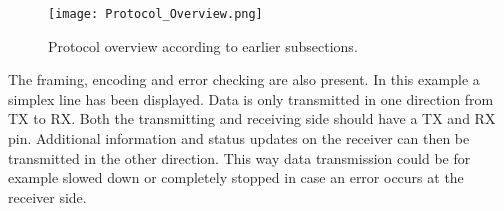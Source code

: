 \begin{figure}[H]
	\centering
	\texttt{[image: Protocol\_Overview.png]}	
	\caption{Protocol overview according to earlier subsections.}
	\label{fig:protocol_overview}
\end{figure} 

The framing, encoding and error checking are also present. In this example a simplex line has been displayed. Data is only transmitted in one direction from TX to RX. Both the transmitting and receiving side should have a TX and RX pin. Additional information and status updates on the receiver can then be transmitted in the other direction. This way data transmission could be for example slowed down or completely stopped in case an error occurs at the receiver side.
\newpage